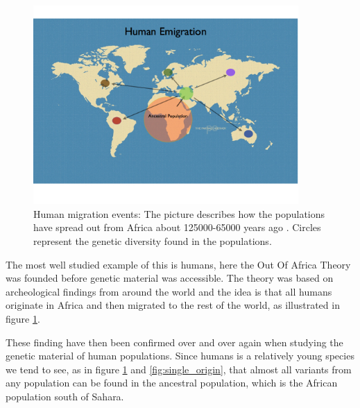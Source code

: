 \documentclass[a4paper,11pt]{kth-mag}
\begin{document}
\begin{figure}[ht]
	\centering
		\includegraphics[width=0.9\textwidth]{../pictures/Single_origin_1.jpg}
	\caption{Human migration events: The picture describes how the populations have spread out from Africa about 125000-65000 years ago \cite{born_in_africa}. Circles represent the genetic diversity found in the populations.}
	\label{fig:human_migrations}
\end{figure}

\vspace{10 mm}


The most well studied example of this is humans, here the Out Of Africa Theory was founded before genetic material was accessible. The theory was based on archeological findings from around the world and the idea is that all humans originate in Africa and then migrated to the rest of the world, as illustrated in figure \ref{fig:human_migrations}.
 
These finding have then been confirmed over and over again when studying the genetic material of human populations. Since humans is a relatively young species we tend to see, as in figure \ref{fig:human_migrations} and \ref{fig:single_origin}, that almost all variants from any population can be found in the ancestral population, which is the African population south of Sahara.
\end{document}
